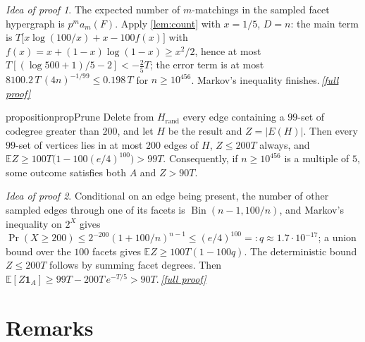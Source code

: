 \documentclass[11pt,a4paper]{article}
\theoremstyle{plain}
\theoremstyle{definition}
\theoremstyle{remark}
\newtheorem*{proofidea}{Idea of proof}
\newcommand{\fullproofref}[1]{\,\hyperref[#1]{\textit{[full proof]}}}
\newcommand{\E}{\mathbb E}
\newcommand{\Hrand}{H_{\mathrm{rand}}}
\newcommand{\ind}{\mathbf 1}
\DeclareMathOperator{\Bin}{Bin}
\begin{document}
\begin{proofidea}
The expected number of $m$-matchings in the sampled facet hypergraph is $p^m a_m(F)$. Apply \cref{lem:count} with $x=1/5$, $D=n$: the main term is $T\bigl[x\log(100/x)+x-100f(x)\bigr]$ with $f(x)=x+(1-x)\log(1-x)\ge x^2/2$, hence at most $T[(\log500+1)/5-2]<-\tfrac25T$; the error term is at most $8100.2\,T\,(4n)^{-1/99}\le0.198\,T$ for $n\ge10^{456}$. Markov's inequality finishes.\fullproofref{pf:firstmoment}
\end{proofidea}

\begin{restatable}[Pruning]{proposition}{propPrune}\label{prop:prune}
Delete from $\Hrand$ every edge containing a $99$-set of codegree greater than $200$, and let $H$ be the result and $Z=|E(H)|$. Then every $99$-set of vertices lies in at most $200$ edges of $H$, $Z\le200T$ always, and $\E Z\ge100T\bigl(1-100(e/4)^{100}\bigr)>99T$. Consequently, if $n\ge10^{456}$ is a multiple of $5$, some outcome satisfies both $A$ and $Z>90T$.
\end{restatable}

\begin{proofidea}
Conditional on an edge being present, the number of other sampled edges through one of its facets is $\Bin(n-1,100/n)$, and Markov's inequality on $2^X$ gives $\Pr(X\ge200)\le2^{-200}(1+100/n)^{n-1}\le(e/4)^{100}=:q\approx1.7\cdot10^{-17}$; a union bound over the $100$ facets gives $\E Z\ge100T(1-100q)$. The deterministic bound $Z\le200T$ follows by summing facet degrees. Then $\E[Z\ind_A]\ge99T-200T\,e^{-T/5}>90T$.\fullproofref{pf:prune}
\end{proofidea}

\section{Remarks}\label{sec:remarks}
\end{document}
